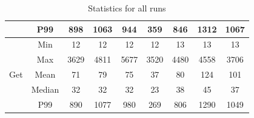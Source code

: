 \documentclass[a4paper,12pt]{article} %
\begin{document}
\begin{enumerate}
\begin{table}[H]
\begin{tabular}{|cc|ccc|ccc|c|}
    \multicolumn{1}{|c|}{}                      & P99    & \multicolumn{1}{c|}{898}     & \multicolumn{1}{c|}{1063}    & 944     & \multicolumn{1}{c|}{359}     & \multicolumn{1}{c|}{846}     & 1312    & 1067               \\ \hline
    \multicolumn{1}{|c|}{\multirow{5}{*}{Get}}  & Min    & \multicolumn{1}{c|}{12}      & \multicolumn{1}{c|}{12}      & 12      & \multicolumn{1}{c|}{12}      & \multicolumn{1}{c|}{13}      & 13      & 13                 \\ \cline{2-9} 
    \multicolumn{1}{|c|}{}                      & Max    & \multicolumn{1}{c|}{3629}    & \multicolumn{1}{c|}{4811}    & 5677    & \multicolumn{1}{c|}{3520}    & \multicolumn{1}{c|}{4480}    & 4558    & 3706               \\ \cline{2-9} 
    \multicolumn{1}{|c|}{}                      & Mean   & \multicolumn{1}{c|}{71}      & \multicolumn{1}{c|}{79}      & 75      & \multicolumn{1}{c|}{37}      & \multicolumn{1}{c|}{80}      & 124     & 101                \\ \cline{2-9} 
    \multicolumn{1}{|c|}{}                      & Median & \multicolumn{1}{c|}{32}      & \multicolumn{1}{c|}{32}      & 32      & \multicolumn{1}{c|}{23}      & \multicolumn{1}{c|}{38}      & 45      & 37                 \\ \cline{2-9} 
    \multicolumn{1}{|c|}{}                      & P99    & \multicolumn{1}{c|}{890}     & \multicolumn{1}{c|}{1077}    & 980     & \multicolumn{1}{c|}{269}     & \multicolumn{1}{c|}{806}     & 1290    & 1049               \\ \hline
    \end{tabular}
    \caption{Statistics for all runs}
    \end{table}

\end{enumerate}

\clearpage
\end{document}
